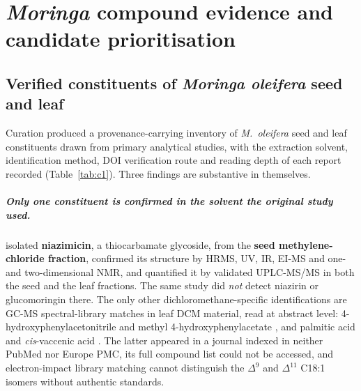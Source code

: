 \chapter{\textit{Moringa} compound evidence and candidate prioritisation}\label{ch:compounds}

\section{Verified constituents of \textit{Moringa oleifera} seed and leaf}\label{sec:constituents}

Curation produced a provenance-carrying inventory of \textit{M.~oleifera} seed and leaf
constituents drawn from primary analytical studies, with the extraction solvent,
identification method, DOI verification route and reading depth of each report recorded
(Table~\ref{tab:c1}). Three findings are substantive in themselves.

\paragraph{Only one constituent is confirmed in the solvent the original study used.}
\textcite{abdelsayed2021jfda} isolated \textbf{niazimicin}, a thiocarbamate glycoside, from
the \textbf{seed methylene-chloride fraction}, confirmed its structure by HRMS, UV, IR, EI-MS
and one- and two-dimensional NMR, and quantified it by validated UPLC-MS/MS in both the seed
and the leaf  fractions. The same study did \emph{not} detect niazirin or
glucomoringin there. The only other dichloromethane-specific identifications are GC-MS
spectral-library matches in leaf DCM material, read at abstract level:
4-hydroxyphenylacetonitrile and methyl 4-hydroxyphenylacetate \parencite{mohdfisall2021},
and palmitic acid and \textit{cis}-vaccenic acid \parencite{khandelwal2019}. The latter
appeared in a journal indexed in neither PubMed nor Europe PMC, its full compound list could
not be accessed, and electron-impact library matching cannot distinguish the $\Delta^{9}$
and $\Delta^{11}$ C18:1 isomers without authentic standards.

